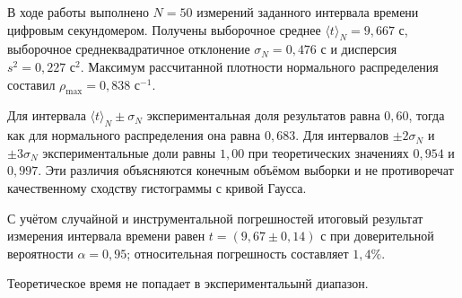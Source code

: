 \documentclass[a4paper,14pt]{extarticle}
\begin{document}
	В ходе работы выполнено $N=50$ измерений заданного интервала времени цифровым секундомером. Получены выборочное среднее $\langle t \rangle_N=9{,}667$ с, выборочное среднеквадратичное отклонение $\sigma_N=0{,}476$ с и дисперсия $s^2=0{,}227$ с$^2$. Максимум рассчитанной плотности нормального распределения составил $\rho_{\max}=0{,}838$ с$^{-1}$.

	Для интервала $\langle t \rangle_N\pm\sigma_N$ экспериментальная доля результатов равна $0{,}60$, тогда как для нормального распределения она равна $0{,}683$. Для интервалов $\pm2\sigma_N$ и $\pm3\sigma_N$ экспериментальные доли равны $1{,}00$ при теоретических значениях $0{,}954$ и $0{,}997$. Эти различия объясняются конечным объёмом выборки и не противоречат качественному сходству гистограммы с кривой Гаусса.

	С учётом случайной и инструментальной погрешностей итоговый результат измерения интервала времени равен $t=(9{,}67\pm0{,}14)$ с при доверительной вероятности $\alpha=0{,}95$; относительная погрешность составляет $1{,}4\%$.
	
    Теоретическое время не попадает в экспериментальынй диапазон.
\end{document}
